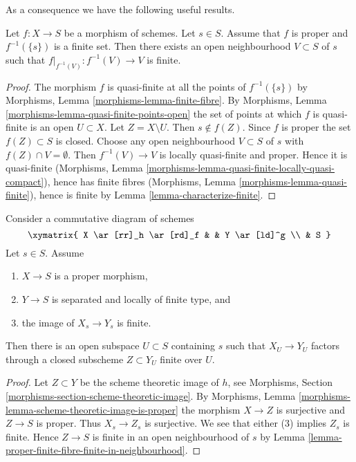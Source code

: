 \noindent
As a consequence we have the following useful results.

\begin{lemma}
\label{lemma-proper-finite-fibre-finite-in-neighbourhood}
Let $f : X \to S$ be a morphism of schemes.
Let $s \in S$.
Assume that $f$ is proper and $f^{-1}(\{s\})$ is a finite set.
Then there exists an open neighbourhood $V \subset S$ of $s$
such that $f|_{f^{-1}(V)} : f^{-1}(V) \to V$ is finite.
\end{lemma}

\begin{proof}
The morphism $f$ is quasi-finite at all the points of $f^{-1}(\{s\})$
by Morphisms, Lemma \ref{morphisms-lemma-finite-fibre}.
By Morphisms, Lemma \ref{morphisms-lemma-quasi-finite-points-open} the
set of points at which $f$ is quasi-finite is an open $U \subset X$.
Let $Z = X \setminus U$. Then $s \not \in f(Z)$. Since $f$ is proper
the set $f(Z) \subset S$ is closed. Choose any open neighbourhood
$V \subset S$ of $s$ with $f(Z) \cap V = \emptyset$. Then
$f^{-1}(V) \to V$ is locally quasi-finite and proper.
Hence it is quasi-finite
(Morphisms, Lemma \ref{morphisms-lemma-quasi-finite-locally-quasi-compact}),
hence has finite fibres
(Morphisms, Lemma \ref{morphisms-lemma-quasi-finite}), hence
is finite by Lemma \ref{lemma-characterize-finite}.
\end{proof}

\begin{lemma}
\label{lemma-flat-proper-family-cannot-collapse-fibre}
Consider a commutative diagram of schemes
$$
\xymatrix{
X \ar[rr]_h \ar[rd]_f & & Y \ar[ld]^g \\
& S
}
$$
Let $s \in S$. Assume
\begin{enumerate}
\item $X \to S$ is a proper morphism,
\item $Y \to S$ is separated and locally of finite type, and
\item the image of $X_s \to Y_s$ is finite.
\end{enumerate}
Then there is an open
subspace $U \subset S$ containing $s$ such that $X_U \to Y_U$
factors through a closed subscheme $Z \subset Y_U$ finite over $U$.
\end{lemma}

\begin{proof}
Let $Z \subset Y$ be the scheme theoretic image of $h$, see
Morphisms, Section \ref{morphisms-section-scheme-theoretic-image}.
By Morphisms, Lemma \ref{morphisms-lemma-scheme-theoretic-image-is-proper}
the morphism $X \to Z$ is surjective and $Z \to S$ is proper.
Thus $X_s \to Z_s$ is surjective. We see that either
(3) implies $Z_s$ is finite.
Hence $Z \to S$ is finite in an open neighbourhood of $s$ by
Lemma \ref{lemma-proper-finite-fibre-finite-in-neighbourhood}.
\end{proof}





